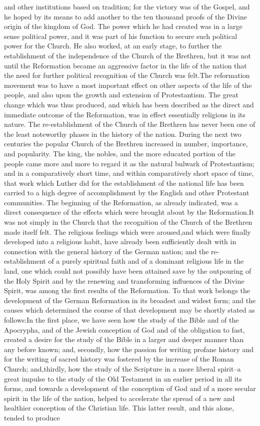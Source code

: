 \documentclass[a4paper]{article}
\begin{document}
and other institutions based on tradition; for the victory was of the Gospel, and he hoped by its means to add another to the ten thousand proofs of the Divine origin of the kingdom of God. The power which he had created was in a large sense political power, and it was part of his function to secure such political power for the Church. He also worked, at an early stage, to further the establishment of the independence of the Church of the Brethren, but it was not until the Reformation became an aggressive factor in the life of the nation that the need for further political recognition of the Church was felt.The reformation movement was to have a most important effect on other aspects of the life of the people, and also upon the growth and extension of Protestantism. The great change which was thus produced, and which has been described as the direct and immediate outcome of the Reformation, was in effect essentially religious in its nature. The re-establishment of the Church of the Brethren has never been one of the least noteworthy phases in the history of the nation. During the next two centuries the popular Church of the Brethren increased in number, importance, and popularity. The king, the nobles, and the more educated portion of the people came more and more to regard it as the natural bulwark of Protestantism; and in a comparatively short time, and within comparatively short space of time, that work which Luther did for the establishment of the national life has been carried to a high degree of accomplishment by the English and other Protestant communities. The beginning of the Reformation, as already indicated, was a direct consequence of the effects which were brought about by the Reformation.It was not simply in the Church that the recognition of the Church of the Brethren made itself felt. The religious feelings which were aroused,and which were finally developed into a religious habit, have already been sufficiently dealt with in connection with the general history of the German nation; and the re-establishment of a purely spiritual faith and of a dominant religious life in the land, one which could not possibly have been attained save by the outpouring of the Holy Spirit and by the renewing and transforming influences of the Divine Spirit, was among the first results of the Reformation. To that work belongs the development of the German Reformation in its broadest and widest form; and the causes which determined the course of that development may be shortly stated as follows:In the first place, we have seen how the study of the Bible and of the Apocrypha, and of the Jewish conception of God and of the obligation to fast, created a desire for the study of the Bible in a larger and deeper manner than any before known; and, secondly, how the passion for writing profane history and for the writing of sacred history was fostered by the increase of the Roman Church; and,thirdly, how the study of the Scripture in a more liberal spirit--a great impulse to the study of the Old Testament in an earlier period in all its forms, and towards a development of the conception of God and of a more secular spirit in the life of the nation, helped to accelerate the spread of a new and healthier conception of the Christian life. This latter result, and this alone, tended to produce 
\end{document}
